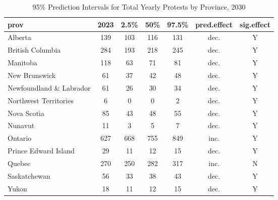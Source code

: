 \begin{table}[H]
\centering
\begin{tabular}{|l|c|c|c|c|c|c|}
  \hline
\textbf{prov} & \textbf{2023} & \textbf{2.5\%} & \textbf{50\%} & \textbf{97.5\%} & \textbf{pred.effect} & \textbf{sig.effect} \\  
  \hline
Alberta & 139 & 103 & 116 & 131 & dec. & Y \\ 
  British Columbia & 284 & 193 & 218 & 245 & dec. & Y \\ 
  Manitoba & 118 & 63 & 71 & 81 & dec. & Y \\ 
  New Brunswick &  61 & 37 & 42 & 48 & dec. & Y \\ 
  Newfoundland \& Labrador &  61 & 26 & 30 & 34 & dec. & Y \\ 
  Northwest Territories &   6 & 0 & 0 & 2 & dec. & Y \\ 
  Nova Scotia &  85 & 43 & 48 & 55 & dec. & Y \\ 
  Nunavut &  11 & 3 & 5 & 7 & dec. & Y \\ 
  Ontario & 627 & 668 & 755 & 849 & inc. & Y \\ 
  Prince Edward Island &  29 & 11 & 12 & 15 & dec. & Y \\ 
  Quebec & 270 & 250 & 282 & 317 & inc. & N \\ 
  Saskatchewan &  56 & 33 & 38 & 43 & dec. & Y \\ 
  Yukon &  18 & 11 & 12 & 15 & dec. & Y \\ 
   \hline
\end{tabular}
\caption{95\% Prediction Intervals for Total Yearly Protests by Province, 2030} 
\end{table}
